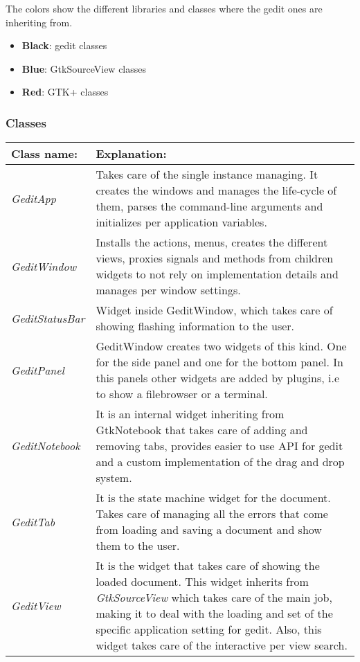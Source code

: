 The colors show the different libraries and classes where the gedit ones are inheriting from.
\begin{itemize}
  \item \textbf{Black}: gedit classes
  \item \textbf{Blue}: GtkSourceView classes
  \item \textbf{Red}: GTK+ classes
\end{itemize}

\newpage
\subsubsection{Classes}

\begin{table}[H]
  \begin{center}
    \begin{tabularx}{\textwidth}{|l|X|}
      \firsthline
      \textbf{Class name:} & \textbf{Explanation:} \\
      \hline
      \textit{GeditApp} & Takes care of the single instance managing. It creates the windows and manages the life-cycle of them, parses the command-line arguments and initializes per application variables. \\
      \hline
      \textit{GeditWindow} & Installs the actions, menus, creates the different views, proxies signals and methods from children widgets to not rely on implementation details and manages per window settings. \\
      \hline
      \textit{GeditStatusBar} & Widget inside GeditWindow, which takes care of showing flashing information to the user. \\
      \hline
      \textit{GeditPanel} & GeditWindow creates two widgets of this kind. One for the side panel and one for the bottom panel. In this panels other widgets are added by plugins, i.e to show a filebrowser or a terminal. \\
      \hline
      \textit{GeditNotebook} & It is an internal widget inheriting from GtkNotebook that takes care of adding and removing tabs, provides easier to use API for gedit and a custom implementation of the drag and drop system. \\
      \hline
      \textit{GeditTab} & It is the state machine widget for the document. Takes care of managing all the errors that come from loading and saving a document and show them to the user. \\
      \hline
      \textit{GeditView} & It is the widget that takes care of showing the loaded document. This widget inherits from \emph{GtkSourceView} which takes care of the main job, making it to deal with the loading and set of the specific application setting for gedit. Also, this widget takes care of the interactive per view search. \\

\end{tabularx}
\end{center}
\end{table}
